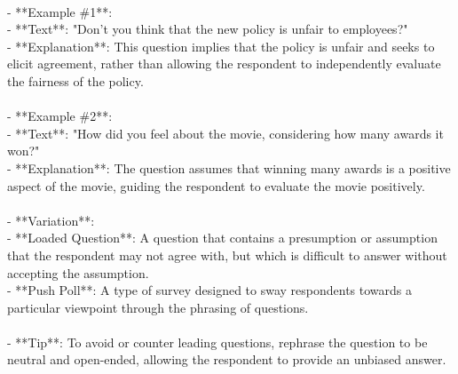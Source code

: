 \documentclass[a4paper,12pt,single,pdftex]{scrartcl}
\begin{document}
    
      
    \\

    
      - **Example \#1**:
    \\

    
        - **Text**: "Don’t you think that the new policy is unfair to employees?"
    \\

    
        - **Explanation**: This question implies that the policy is unfair and seeks to elicit agreement, rather than allowing the respondent to independently evaluate the fairness of the policy.
    \\

    
      
    \\

    
      - **Example \#2**:
    \\

    
        - **Text**: "How did you feel about the movie, considering how many awards it won?"
    \\

    
        - **Explanation**: The question assumes that winning many awards is a positive aspect of the movie, guiding the respondent to evaluate the movie positively.
    \\

    
      
    \\

    
      - **Variation**:
    \\

    
        - **Loaded Question**: A question that contains a presumption or assumption that the respondent may not agree with, but which is difficult to answer without accepting the assumption.
    \\

    
        - **Push Poll**: A type of survey designed to sway respondents towards a particular viewpoint through the phrasing of questions.
    \\

    
      
    \\

    
      - **Tip**: To avoid or counter leading questions, rephrase the question to be neutral and open-ended, allowing the respondent to provide an unbiased answer.
    \\

    
      
\end{document}
